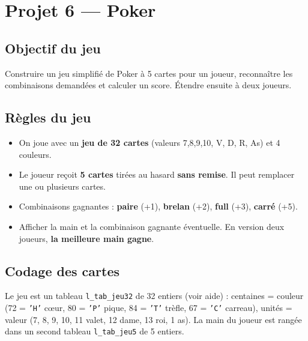 \section{Projet 6 — Poker}

\subsection*{Objectif du jeu}
Construire un jeu simplifié de Poker à 5 cartes pour un joueur, reconnaître les combinaisons demandées et calculer un score. Étendre ensuite à deux joueurs.

\subsection*{Règles du jeu}
\begin{itemize}
  \item On joue avec un \textbf{jeu de 32 cartes} (valeurs 7,8,9,10, V, D, R, As) et 4 couleurs.
  \item Le joueur reçoit \textbf{5 cartes} tirées au hasard \textbf{sans remise}. Il peut remplacer une ou plusieurs cartes.
  \item Combinaisons gagnantes : \textbf{paire} (+1), \textbf{brelan} (+2), \textbf{full} (+3), \textbf{carré} (+5).
  \item Afficher la main et la combinaison gagnante éventuelle. En version deux joueurs, \textbf{la meilleure main gagne}.
\end{itemize}

\subsection*{Codage des cartes}
Le jeu est un tableau \texttt{l\_tab\_jeu32} de 32 entiers (voir aide) : centaines = couleur (72 = \texttt{'H'} c\oe{}ur, 80 = \texttt{'P'} pique, 84 = \texttt{'T'} trèfle, 67 = \texttt{'C'} carreau), unités = valeur (7, 8, 9, 10, 11 valet, 12 dame, 13 roi, 1 as). La main du joueur est rangée dans un second tableau \texttt{l\_tab\_jeu5} de 5 entiers.

